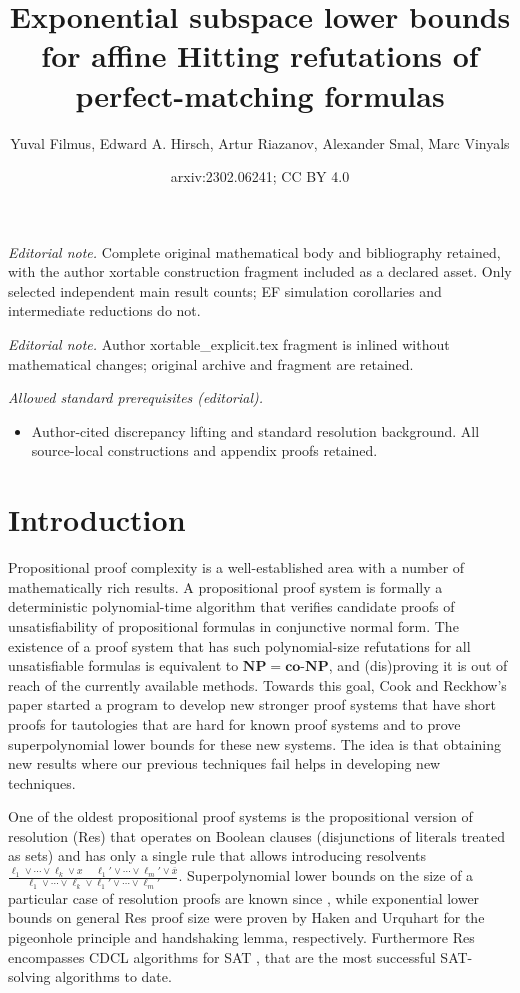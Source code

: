 \documentclass[11pt]{article}
\title{Exponential subspace lower bounds for affine Hitting refutations of perfect-matching formulas}
\author{Yuval Filmus, Edward A. Hirsch, Artur Riazanov, Alexander Smal, Marc Vinyals}
\date{arxiv:2302.06241; CC BY 4.0}
\newcommand{\scterm}[1]{{\textrm{\sc #1}}}
\newcommand{\res}{\scterm{Res}}
\newcommand{\olnot}[1]{\overline{#1}}
\numberwithin{equation}{section}
\begin{document}
\maketitle
\noindent\textit{Editorial note.} Complete original mathematical body and bibliography retained, with the author xortable construction fragment included as a declared asset. Only selected independent main result counts; EF simulation corollaries and intermediate reductions do not.\par\medskip
\noindent\textit{Editorial note.} Author xortable\_explicit.tex fragment is inlined without mathematical changes; original archive and fragment are retained.\par\medskip
\noindent\textit{Allowed standard prerequisites (editorial).}\begin{itemize}
\item Author-cited discrepancy lifting and standard resolution background. All source-local constructions and appendix proofs retained.
\end{itemize}\medskip
\section{Introduction}
Propositional proof complexity is a well-established area with a number
of mathematically rich results. A propositional proof system \cite{CR79}
is formally a deterministic polynomial-time algorithm that verifies
candidate proofs of unsatisfiability of propositional formulas in conjunctive normal form.
The existence of a proof system that has such polynomial-size refutations for
all unsatisfiable formulas is equivalent to $\mathbf{NP}=\mathbf{co\textbf{-}NP}$,
and (dis)proving it is out of reach of the currently available methods.
Towards this goal, 
Cook and Reckhow's paper \cite{CR79}
started a program to develop new stronger proof systems 
that have short proofs for tautologies 
that are hard for known proof systems
and to prove superpolynomial lower bounds for these new systems.
The idea is that obtaining new results where our previous techniques fail helps in developing new techniques.

One of the oldest propositional proof systems is the propositional version of resolution ({\res}) \cite{Bla37, DP60}
that operates on Boolean clauses (disjunctions of literals treated as sets)
and has only a single rule that allows introducing resolvents
$\frac{\ell_1\lor\dotsb\lor\ell_k\lor x\;\quad \ell_1'\lor\dotsb\lor\ell_m'\lor\olnot{x}}{\ell_1\lor\dotsb\lor\ell_k\lor \ell_1'\lor\dotsb\lor\ell_m'}$.
Superpolynomial lower bounds on the size of a particular case of resolution proofs
are known since \cite{Tse68}, while exponential lower bounds on general {\res} proof size were proven by Haken \cite{Hak85} and Urquhart \cite{Urq87}
for the pigeonhole principle and handshaking lemma, respectively.
Furthermore {\res} encompasses CDCL algorithms for SAT \cite{BKS04,PD11}, that are the most successful SAT-solving algorithms to date.
\end{document}
